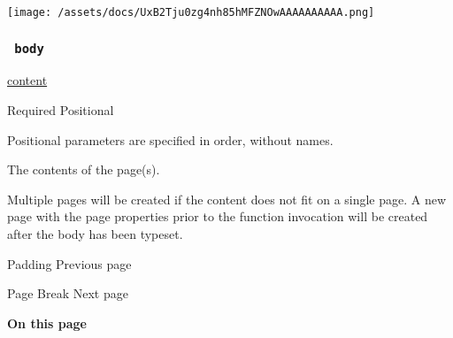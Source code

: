 \texttt{[image: /assets/docs/UxB2Tju0zg4nh85hMFZNOwAAAAAAAAAA.png]}

\subsubsection{\texorpdfstring{\texttt{\ body\ }}{ body }}\label{parameters-body}

\href{/docs/reference/foundations/content/}{content}

{Required} {{ Positional }}

\label{parameters-body-positional-tooltip}
Positional parameters are specified in order, without names.

The contents of the page(s).

Multiple pages will be created if the content does not fit on a single
page. A new page with the page properties prior to the function
invocation will be created after the body has been typeset.

\href{/docs/reference/layout/pad/}{\pandocbounded{}}

{ Padding } { Previous page }

\href{/docs/reference/layout/pagebreak/}{\pandocbounded{}}

{ Page Break } { Next page }

\textbf{On this page}

